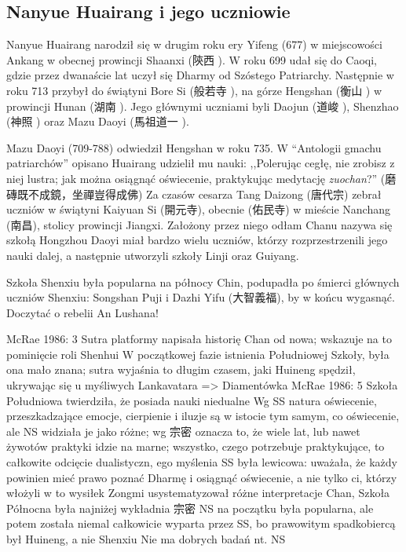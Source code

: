 \subsection{Nanyue Huairang i jego uczniowie}
Nanyue Huairang narodził się w drugim roku ery Yifeng (677) w miejscowości Ankang w obecnej prowincji Shaanxi (陝西 ).
W roku 699 udał się do Caoqi, gdzie przez dwanaście lat uczył się Dharmy od Szóstego Patriarchy.
Następnie w roku 713 przybył do świątyni Bore Si (般若寺 ), na górze Hengshan (衡山 ) w prowincji Hunan (湖南 ).
Jego głównymi uczniami byli Daojun (道峻 ), Shenzhao (神照 ) oraz Mazu Daoyi (馬祖道一 ).

Mazu Daoyi (709-788) odwiedził Hengshan w roku 735.
W ``Antologii gmachu patriarchów'' opisano
Huairang udzielił mu nauki: ,,Polerując cegłę, nie zrobisz z niej lustra; jak można osiągnąć oświecenie, praktykując medytację \textit{zuochan}?'' (磨磚既不成鏡，坐禪豈得成佛)
Za czasów cesarza Tang Daizong (唐代宗) zebrał uczniów w świątyni Kaiyuan Si (開元寺), obecnie (佑民寺) w mieście Nanchang (南昌), stolicy prowincji Jiangxi.
Założony przez niego odłam Chanu nazywa się szkołą Hongzhou
Daoyi miał bardzo wielu uczniów, którzy rozprzestrzenili jego nauki dalej, a następnie utworzyli szkoły Linji oraz Guiyang.


Szkoła Shenxiu była popularna na północy Chin, podupadła po śmierci głównych uczniów Shenxiu: Songshan Puji i Dazhi Yifu (大智義福), by w końcu wygasnąć. %
Doczytać o rebelii An Lushana!

McRae 1986: 3
Sutra platformy napisała historię Chan od nowa; wskazuje na to pominięcie roli Shenhui
W początkowej fazie istnienia Południowej Szkoły, była ona mało znana; sutra wyjaśnia to długim czasem, jaki Huineng spędził, ukrywając się u myśliwych
Lankavatara => Diamentówka
McRae 1986: 5
Szkoła Południowa twierdziła, że posiada nauki niedualne
Wg SS natura oświecenie, przeszkadzające emocje, cierpienie i iluzje są w istocie tym samym, co oświecenie, ale NS widziała je jako różne; wg 宗密 oznacza to, że wiele lat, lub nawet żywotów praktyki idzie na marne; wszystko, czego potrzebuje praktykujące, to całkowite odcięcie dualistyczn, ego myślenia
SS była lewicowa: uważała, że każdy powinien mieć prawo poznać Dharmę i osiągnąć oświecenie, a nie tylko ci, którzy włożyli w to wysiłek
Zongmi usystematyzował różne interpretacje Chan, Szkoła Północna była najniżej
wykładnia 宗密 NS na początku była popularna, ale potem została niemal całkowicie wyparta przez SS, bo prawowitym spadkobiercą był Huineng, a nie Shenxiu
Nie ma dobrych badań nt. NS

